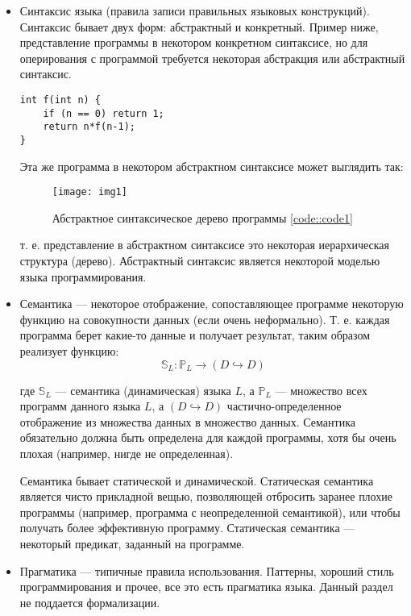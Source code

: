 \begin{itemize}
\item Синтаксис языка (правила записи правильных языковых конструкций). Синтаксис бывает двух форм: абстрактный и конкретный. Пример ниже, представление программы в
некотором конкретном синтаксисе, но для оперирования с программой требуется некоторая абстракция или абстрактный синтаксис.

\begin{lstlisting}
int f(int n) {
	if (n == 0) return 1;
	return n*f(n-1);
}
\end{lstlisting}
\label{code::code1}

Эта же программа в некотором абстрактном синтаксисе может выглядить так:

\begin{figure}
\texttt{[image: img1]}
\caption{Абстрактное синтаксическое дерево программы \ref{code::code1}}
\label{img::img1}
\end{figure}

т. е. представление в абстрактном синтаксисе это некоторая иерархическая структура (дерево). Абстрактный синтаксис является некоторой моделью языка
программирования.

\item Семантика --- некоторое отображение, сопоставляющее программе некоторую функцию на совокупности данных (если очень неформально). Т. е. каждая программа
берет какие-то данные и получает результат, таким образом реализует функцию: $$ \mathbb{S}_L : \mathbb{P}_L \rightarrow \left(D \hookrightarrow D\right) $$

где $\mathbb{S}_L$ --- семантика (динамическая) языка $L$, а $\mathbb{P}_L$ --- множество всех программ данного языка $L$, а $\left(D \hookrightarrow D\right)$
частично-определенное отображение из множества данных в множество данных. Семантика обязательно должна быть определена для каждой программы, хотя бы очень плохая (например, нигде не определенная).

Семантика бывает статической и динамической. Статическая семантика является чисто прикладной вещью, позволяющей отбросить заранее плохие программы (например,
программа с неопределенной семантикой), или чтобы получать более эффективную программу. Статическая семантика --- некоторый предикат, заданный на программе.

\item Прагматика --- типичные правила использования. Паттерны, хороший стиль программирования и прочее, все это есть прагматика языка. Данный раздел не поддается
формализации.
\end{itemize}

